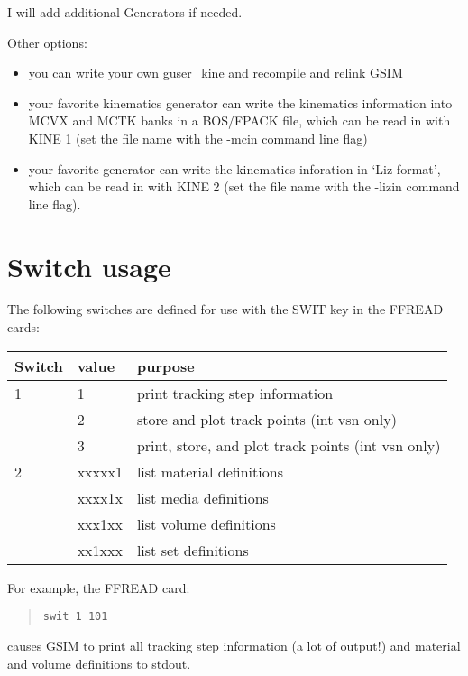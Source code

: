 \documentclass{article}
\begin{document}
\noindent
I will add additional Generators if needed.

Other options:
\begin{itemize}
\item you can write your own guser\_kine and recompile and
relink GSIM
\item your favorite kinematics generator can write the
kinematics information into MCVX and MCTK banks in a BOS/FPACK file,
which can be read in with KINE 1 (set the file name with the -mcin
command line flag)
\item your favorite generator can write the kinematics
inforation in `Liz-format', which can be read in with KINE 2 (set the
file name with the -lizin command line flag).
\end{itemize}


\newpage
\section{Switch usage}
\label{switches}

The following switches are defined for use with the SWIT key in the
FFREAD cards:

\par
\begin{center}
\begin{tabular}{|l|l|l|} \hline

Switch &  value   &   purpose \\ \hline
1      &  1       &   print tracking step information\\
       &  2       &   store and plot track points (int vsn only) \\
       &  3       &   print, store, and plot track points (int vsn only) \\ \hline
2      &  xxxxx1  &   list material definitions \\
       &  xxxx1x  &   list media definitions \\
       &  xxx1xx  &   list volume definitions \\
       &  xx1xxx  &   list set definitions \\ \hline
\end{tabular}
\end{center}
\par

\noindent
For example, the FFREAD card:
\begin{quote}
{\tt swit 1 101}
\end{quote}
causes GSIM to print all tracking step information (a lot of
output!) and material and volume definitions to stdout.
\end{document}
